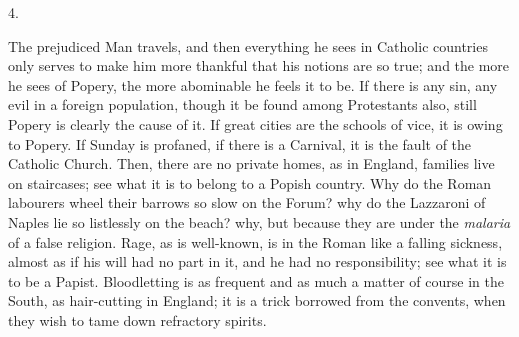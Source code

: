 4.

The prejudiced Man travels, and then everything he
sees in Catholic countries only serves to make him more
thankful that his notions are so true; and the more he
sees of Popery, the more abominable he feels it to be. If
there is any sin, any evil in a foreign population,
though it be found among Protestants also, still Popery
is clearly the cause of it. If great cities are the
schools of vice, it is owing to Popery. If Sunday is
profaned, if there is a Carnival, it is the fault of the
Catholic Church. Then, there are no private homes, as in
England, families live on staircases; see what it is to
belong to a Popish country. Why do the Roman labourers
wheel their barrows so slow on the Forum? why do the
Lazzaroni of Naples lie so listlessly on the beach? why,
but because they are under the \emph{malaria} of a
false religion. Rage, as is well-known, is in the Roman
like a falling sickness, almost as if his will had no
part in it, and he had no responsibility; see what it is
to be a Papist. Bloodletting is as frequent and as much a
matter of course in the South, as hair-cutting in
England; it is a trick borrowed from the convents, when
they wish to tame down refractory spirits.

